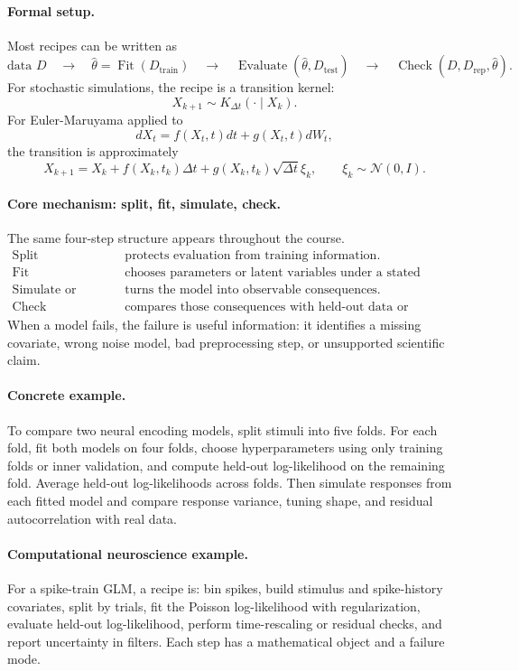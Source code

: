 \paragraph{Formal setup.}
Most recipes can be written as
\[
\text{data }D
\quad\longrightarrow\quad
\widehat\theta=\operatorname{Fit}(D_{\mathrm{train}})
\quad\longrightarrow\quad
\operatorname{Evaluate}(\widehat\theta,D_{\mathrm{test}})
\quad\longrightarrow\quad
\operatorname{Check}(D,D_{\mathrm{rep}},\widehat\theta).
\]
For stochastic simulations, the recipe is a transition kernel:
\[
X_{k+1}\sim K_{\Delta t}(\cdot\mid X_k).
\]
For Euler-Maruyama applied to
\[
dX_t=f(X_t,t)dt+g(X_t,t)dW_t,
\]
the transition is approximately
\[
X_{k+1}=X_k+f(X_k,t_k)\Delta t+g(X_k,t_k)\sqrt{\Delta t}\xi_k,
\qquad \xi_k\sim\mathcal N(0,I).
\]

\paragraph{Core mechanism: split, fit, simulate, check.}
The same four-step structure appears throughout the course.
\[
\begin{array}{ll}
\text{Split} & \text{protects evaluation from training information.}\\
\text{Fit} & \text{chooses parameters or latent variables under a stated objective.}\\
\text{Simulate or predict} & \text{turns the model into observable consequences.}\\
\text{Check} & \text{compares those consequences with held-out data or diagnostics.}
\end{array}
\]
When a model fails, the failure is useful information: it identifies a missing covariate, wrong noise model, bad preprocessing step, or unsupported scientific claim.

\paragraph{Concrete example.}
To compare two neural encoding models, split stimuli into five folds. For each fold, fit both models on four folds, choose hyperparameters using only training folds or inner validation, and compute held-out log-likelihood on the remaining fold. Average held-out log-likelihoods across folds. Then simulate responses from each fitted model and compare response variance, tuning shape, and residual autocorrelation with real data.

\paragraph{Computational neuroscience example.}
For a spike-train GLM, a recipe is: bin spikes, build stimulus and spike-history covariates, split by trials, fit the Poisson log-likelihood with regularization, evaluate held-out log-likelihood, perform time-rescaling or residual checks, and report uncertainty in filters. Each step has a mathematical object and a failure mode.

